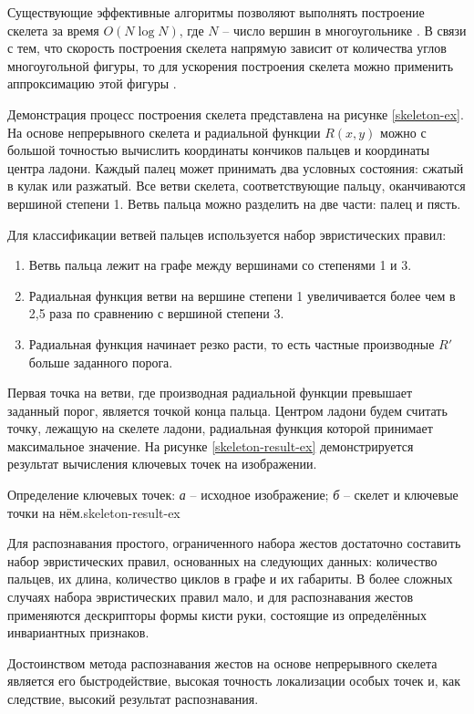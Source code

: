 Существующие эффективные алгоритмы позволяют выполнять построение 
скелета за время $O(N\log{N})$, где $N$ -- число вершин в
многоугольнике \cite{mesteckij-rejer}. В связи с тем, что скорость
построения скелета напрямую зависит от количества углов
многоугольной фигуры, то для ускорения построения скелета можно
применить аппроксимацию этой фигуры \cite{nosov-2}. 

Демонстрация процесс построения скелета представлена на рисунке
\ref{skeleton-ex}. На основе непрерывного скелета и радиальной
функции $R(x,y)$ можно с большой точностью вычислить координаты
кончиков пальцев и координаты центра ладони. Каждый палец может
принимать два условных состояния: сжатый в кулак или разжатый.
Все ветви скелета, соответствующие пальцу, оканчиваются вершиной
степени 1. Ветвь пальца можно разделить на две части: палец и пясть.


Для классификации ветвей пальцев используется набор эвристических 
правил:
\begin{enumerate}
	\item Ветвь пальца лежит на графе между вершинами со степенями
1 и 3.
	\item Радиальная функция ветви на вершине степени 1 увеличивается
более чем в 2,5 раза по сравнению с вершиной степени 3.
	\item Радиальная функция начинает резко расти, то есть частные
производные $R'$ больше заданного порога.
\end{enumerate}

Первая точка на ветви, где производная радиальной функции превышает
заданный порог, является точкой конца пальца. Центром ладони будем
считать точку, лежащую на скелете ладони, радиальная функция
которой принимает максимальное значение. На рисунке 
\ref{skeleton-result-ex} демонстрируется результат вычисления
ключевых точек на изображении.

{Определение ключевых точек: {\it а} -- исходное изображение;
{\it б} -- скелет и ключевые точки на нём.}{skeleton-result-ex}

Для распознавания простого, ограниченного набора жестов достаточно
составить набор эвристических правил, основанных на следующих
данных: количество пальцев, их длина, количество циклов в графе и их 
габариты. В более сложных случаях набора эвристических правил мало, и
для распознавания жестов применяются дескрипторы формы кисти руки,
состоящие из определённых инвариантных признаков.

Достоинством метода распознавания жестов на основе непрерывного
скелета является его быстродействие, высокая точность локализации
особых точек и, как следствие, высокий результат распознавания. 
